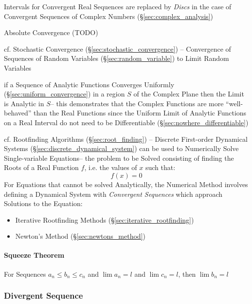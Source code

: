 Intervals for Convergent Real Sequences are replaced by \emph{Discs} in the
case of Convergent Sequences of Complex Numbers (\S\ref{sec:complex_analysis})

Absolute Convergence (TODO)

\fist cf. Stochastic Convergence (\S\ref{sec:stochastic_convergence}) --
Convergence of Sequences of Random Variables (\S\ref{sec:random_variable}) to
Limit Random Variables

if a Sequence of Analytic Functions Converges Uniformly
(\S\ref{sec:uniform_convergence}) in a region $S$ of the Complex Plane then the
Limit is Analytic in $S$-- this demonstrates that the Complex Functions are
more ``well-behaved'' than the Real Functions since the Uniform Limit of
Analytic Functions on a Real Interval do not need to be Differentiable
(\S\ref{sec:nowhere_differentiable})

\fist cf. Rootfinding Algorithms (\S\ref{sec:root_finding}) -- Discrete
First-order Dynamical Systems (\S\ref{sec:discrete_dynamical_system}) can be
used to Numerically Solve Single-variable Equations-- the problem to be Solved
consisting of finding the Roots of a Real Function $f$, i.e. the values of $x$
such that:
\[
  f(x) = 0
\]
For Equations that cannot be solved Analytically, the Numerical Method involves
defining a Dynamical System with \emph{Convergent Sequences} which approach
Solutions to the Equation:
\begin{itemize}
  \item Iterative Rootfinding Methods (\S\ref{sec:iterative_rootfinding})
  \item Newton's Method (\S\ref{sec:newtons_method})
\end{itemize}



\paragraph{Squeeze Theorem}\label{sec:squeeze_theorem}\hfill

For Sequences $a_n \leq b_n \leq c_n$ and $\lim a_n = l$ and $\lim c_n
= l$, then $\lim b_n = l$



\subsubsection{Divergent Sequence}\label{sec:divergent_sequence}



